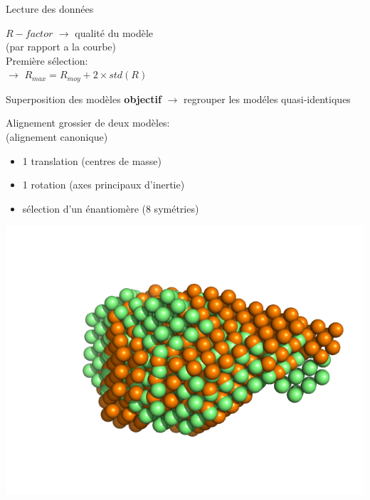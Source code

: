 \documentclass{beamer}
\begin{document}
\begin{frame}{Lecture des donn\'ees}
\begin{minipage}{0.50\linewidth}
\vspace{0.2cm}

$R-factor$ $\longrightarrow$ qualit\'e du mod\`ele\\
(par rapport a la courbe)\\

Premi\`ere s\'election:\\
$\longrightarrow$ $R_{max} = R_{moy} + 2 \times std(R)$
\end{minipage}
\end{frame}

\begin{frame}{Superposition des mod\`eles}
\textbf{objectif} $\longrightarrow$ regrouper les mod\'eles quasi-identiques

\vspace{0.2cm}
\begin{minipage}{0.70\linewidth}
Alignement grossier de deux mod\`eles:\\ 
(alignement canonique)
\begin{itemize}
\item 1 translation (centres de masse)
\item 1 rotation (axes principaux d'inertie)
\item s\'election d'un \'enantiom\`ere (8 sym\'etries)
\end{itemize}

\includegraphics[scale=0.30]{coarsealign.png}


\end{minipage}
\end{frame}
\end{document}
